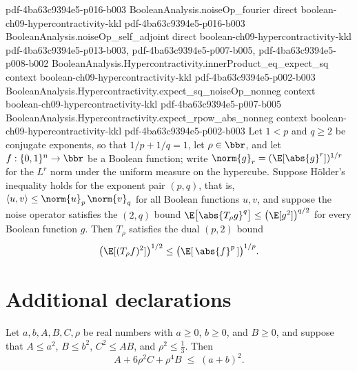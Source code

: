 \begin{theorem}
  {pdf-4ba63c9394e5-p016-b003}
\proofstep
  {BooleanAnalysis.noiseOp_fourier}
  {direct}
  {boolean-ch09-hypercontractivity-kkl}
  {pdf-4ba63c9394e5-p016-b003}
\proofstep
  {BooleanAnalysis.noiseOp_self_adjoint}
  {direct}
  {boolean-ch09-hypercontractivity-kkl}
  {pdf-4ba63c9394e5-p013-b003,
    pdf-4ba63c9394e5-p007-b005,
    pdf-4ba63c9394e5-p008-b002}
\proofstep
  {BooleanAnalysis.Hypercontractivity.innerProduct_eq_expect_sq}
  {context}
  {boolean-ch09-hypercontractivity-kkl}
  {pdf-4ba63c9394e5-p002-b003}
\proofstep
  {BooleanAnalysis.Hypercontractivity.expect_sq_noiseOp_nonneg}
  {context}
  {boolean-ch09-hypercontractivity-kkl}
  {pdf-4ba63c9394e5-p007-b005}
\proofstep
  {BooleanAnalysis.Hypercontractivity.expect_rpow_abs_nonneg}
  {context}
  {boolean-ch09-hypercontractivity-kkl}
  {pdf-4ba63c9394e5-p002-b003}
Let $1 < p$ and $q \ge 2$ be conjugate exponents, so that $1/p + 1/q = 1$, let $\rho \in
\bbr$, and let $f : \{0,1\}^n \to \bbr$ be a Boolean function; write $\norm{g}_r =
(\E[\abs{g}^r])^{1/r}$ for the $L^r$ norm under the uniform measure on the hypercube.
Suppose Hölder's inequality holds for the exponent pair $(p,q)$, that is, $\langle u,
v\rangle \le \norm{u}_p\,\norm{v}_q$ for all Boolean functions $u,v$, and suppose the
noise operator satisfies the $(2,q)$ bound $\E\bigl[\abs{T_\rho g}^q\bigr] \le
\bigl(\E[g^2]\bigr)^{q/2}$ for every Boolean function $g$. Then $T_\rho$ satisfies the
dual $(p,2)$ bound
\[
  \bigl(\E[(T_\rho f)^2]\bigr)^{1/2} \le \bigl(\E[\,\abs{f}^p\,]\bigr)^{1/p}.
\]
\end{theorem}

\section{Additional declarations}

\begin{lemma}
\label{BooleanAnalysis.Hypercontractivity.hypercontractivity_algebra'}
\leanok
{}
Let $a,b,A,B,C,\rho$ be real numbers with $a\ge 0$, $b\ge 0$, and $B\ge 0$, and suppose
that $A\le a^2$, $B\le b^2$, $C^2\le AB$, and $\rho^2\le \tfrac13$. Then
\[
  A + 6\rho^2 C + \rho^4 B \;\le\; (a+b)^2 .
\]
\end{lemma}
